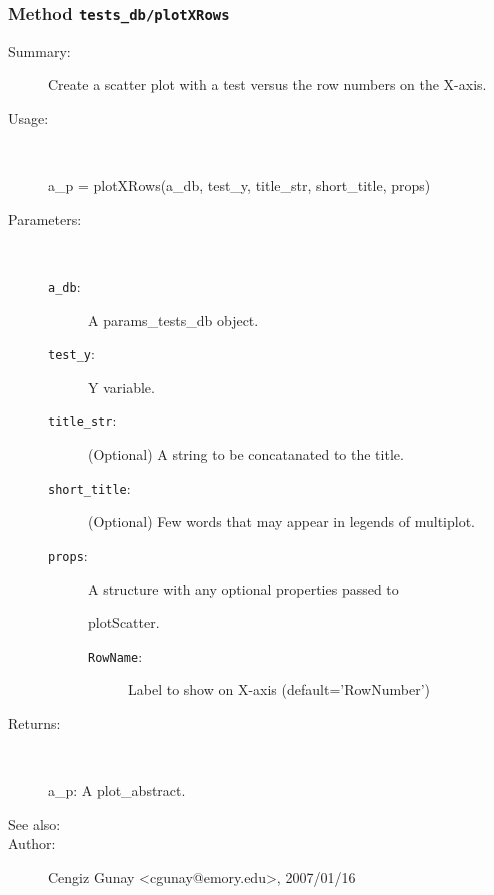 \subsubsection[Method \texttt{plotXRows}]{Method \texttt{tests\_db/plotXRows}}%
%
\label{ref_tests_db__plotXRows}%
\hypertarget{ref_tests_db__plotXRows}{}%
\begin{description}
\item[Summary:]Create a scatter plot with a test versus the row numbers on the X-axis.
%
\item[Usage:]~%
\begin{lyxcode}%
a\_p = plotXRows(a\_db, test\_y, title\_str, short\_title, props)
%
\end{lyxcode}%
%
%
\item[Parameters:]~
\begin{description}%
\item[\texttt{a\_db}:]
 A params\_tests\_db object.
\item[\texttt{test\_y}:]
 Y variable.
\item[\texttt{title\_str}:]
 (Optional) A string to be concatanated to the title.
\item[\texttt{short\_title}:]
 (Optional) Few words that may appear in legends of multiplot.
\item[\texttt{props}:]
 A structure with any optional properties passed to

plotScatter.\begin{description}%
\item[\texttt{RowName}:]
 Label to show on X-axis (default='RowNumber')
\end{description}%
\end{description}%
%
\item[Returns:]~

	a\_p: A plot\_abstract.
%
%
\item[See also:]%
%
\item[Author:]%
Cengiz Gunay <cgunay@emory.edu>, 2007/01/16%
\end{description}
\methodline%
